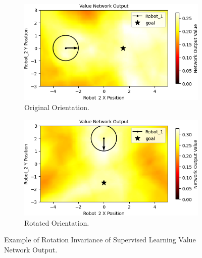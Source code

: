 \documentclass[conference]{IEEEtran}
\begin{document}
\begin{figure}[t]
    \centering
    \begin{subfigure}[b]{0.49\textwidth}
         \centering
         \includegraphics[width=\textwidth]{docs/latex/figures/heatmap_x_Robot_2.png}
         \caption{Original Orientation.}
         \label{fig:heatmap_x}
     \end{subfigure}
     \hfill
     \begin{subfigure}[b]{0.49\textwidth}
         \centering
         \includegraphics[width=\textwidth]{docs/latex/figures/heatmap_y_Robot_2.png}
         \caption{Rotated Orientation.}
         \label{fig:heatmap_y}
     \end{subfigure}
     \caption{Example of Rotation Invariance of Supervised Learning Value Network Output.}\label{fig:heatmap_rot}
\end{figure}
\end{document}
